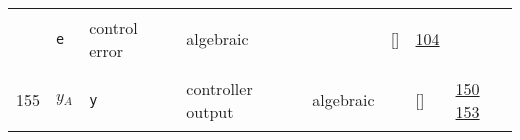 \begin{longtable}{|p{1cm}|p{3cm}|p{3cm}|p{7cm}|p{3.0cm}|p{3cm}|p{2cm}|p{1cm}|}
             & \verb|e|
             & control error
             & \begin{lay}algebraic \end{lay}
             & $  $
             & []
             & \hyperlink{"e:104"}{ 104 }
                 \\
    155
             & \hypertarget{"v:155"}{ $ {y}{_{A}} $}
             & \verb|y|
             & controller output
             & \begin{lay}algebraic \end{lay}
             & $  $
             & []
             & \hyperlink{"e:150"}{ 150 }
                 \hyperlink{"e:153"}{ 153 }
                 \\
    \end{longtable}
